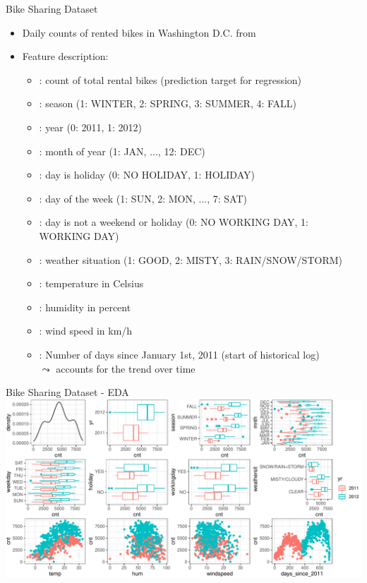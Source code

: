 \documentclass[11pt,compress,t,notes=noshow, aspectratio=169, xcolor=table]{beamer}
\begin{document}
\begin{frame}[t]{Bike Sharing Dataset }
\begin{itemize}
\item Daily counts of rented bikes in Washington D.C. from 
\item Feature description:
\begin{itemize}
\item {}: count of total rental bikes (prediction target for regression)
\item {}: season (1: WINTER, 2: SPRING, 3: SUMMER, 4: FALL)
\item {}: year (0: 2011, 1: 2012)
\item {}: month of year (1: JAN, ..., 12: DEC)
\item {}: day is holiday (0: NO HOLIDAY, 1: HOLIDAY)
\item {}: day of the week (1: SUN, 2: MON, ..., 7: SAT)
\item {}: day is not a weekend or holiday (0: NO WORKING DAY, 1: WORKING DAY)
\item {}: weather situation (1: GOOD, 2: MISTY, 3: RAIN/SNOW/STORM)
\item {}: temperature in Celsius
\item {}: humidity in percent
\item {}: wind speed in km/h
\item {}: Number of days since January 1st, 2011 (start of historical log)\\
$\leadsto$ accounts for the trend over time
\end{itemize}
\end{itemize}
\end{frame}


\begin{frame}[t]{Bike Sharing Dataset - EDA}
\includegraphics[width=\linewidth]{../../slides/intro/figure/intro_bike}
\end{frame}

\endlecture
\end{document}

